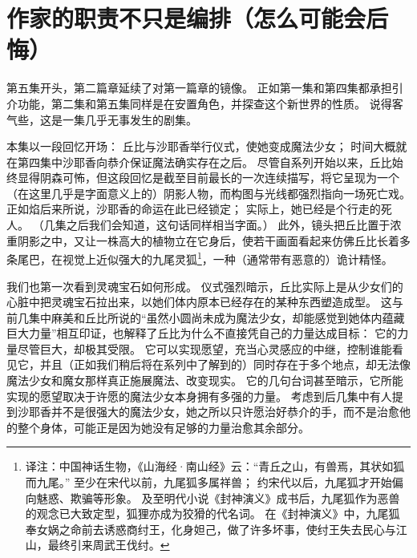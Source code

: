 \chapter[作家的职责不只是编排（怎么可能会后悔）]{作家的职责不只是编排\protect\footnotemark（怎么可能会后悔）}


第五集开头，第二篇章延续了对第一篇章的镜像。
正如第一集和第四集都承担引介功能，第二集和第五集同样是在安置角色，并探查这个新世界的性质。
说得客气些，这是一集几乎无事发生的剧集。

本集以一段回忆开场：
丘比与沙耶香举行仪式，使她变成魔法少女；
时间大概就在第四集中沙耶香向恭介保证魔法确实存在之后。
尽管自系列开始以来，丘比始终显得阴森可怖，但这段回忆是截至目前最长的一次连续描写，将它呈现为一个（在这里几乎是字面意义上的）阴影人物，而构图与光线都强烈指向一场死亡戏。
正如焰后来所说，沙耶香的命运在此已经锁定；
实际上，她已经是个行走的死人。
（几集之后我们会知道，这句话同样相当字面。）
此外，镜头把丘比置于浓重阴影之中，又让一株高大的植物立在它身后，使若干画面看起来仿佛丘比长着多条尾巴，在视觉上近似强大的九尾灵狐\footnote{%
    译注：中国神话生物，《山海经·南山经》云：“青丘之山，有兽焉，其状如狐而九尾。”
    至少在宋代以前，九尾狐多属祥兽；
    约宋代以后，九尾狐才开始偏向魅惑、欺骗等形象。
    及至明代小说《封神演义》成书后，九尾狐作为恶兽的观念已大致定型，狐狸亦成为狡猾的代名词。
    在《封神演义》中，九尾狐奉女娲之命前去诱惑商纣王，化身妲己，做了许多坏事，使纣王失去民心与江山，最终引来周武王伐纣。
}，一种（通常带有恶意的）诡计精怪\cite{ref32}。

我们也第一次看到灵魂宝石如何形成。
仪式强烈暗示，丘比实际上是从少女们的心脏中把灵魂宝石拉出来，以她们体内原本已经存在的某种东西塑造成型。
这与前几集中麻美和丘比所说的“虽然小圆尚未成为魔法少女，却能感觉到她体内蕴藏巨大力量”相互印证，也解释了丘比为什么不直接凭自己的力量达成目标：
它的力量尽管巨大，却极其受限。
它可以实现愿望，充当心灵感应的中继，控制谁能看见它，并且（正如我们稍后将在系列中了解到的）同时存在于多个地点，却无法像魔法少女和魔女那样真正施展魔法、改变现实。
它的几句台词甚至暗示，它所能实现的愿望取决于许愿的魔法少女本身拥有多强的力量。
考虑到后几集中有人提到沙耶香并不是很强大的魔法少女，她之所以只许愿治好恭介的手，而不是治愈他的整个身体，可能正是因为她没有足够的力量治愈其余部分。

